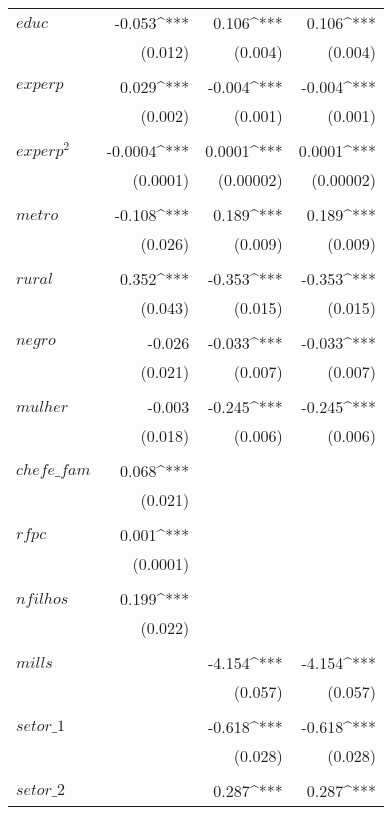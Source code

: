 \begin{apendicesenv}
\begin{footnotesize}
\begin{longtable}{@{\extracolsep{5pt}}lD{.}{.}{-3} D{.}{.}{-3} D{.}{.}{-3} }
	  $educ$ & -0.053^{***} & 0.106^{***} & 0.106^{***} \\ 
	  & (0.012) & (0.004) & (0.004) \\ 
	  & & & \\ 
	 $experp$ & 0.029^{***} & -0.004^{***} & -0.004^{***} \\ 
	  & (0.002) & (0.001) & (0.001) \\ 
	  & & & \\ 
	 $experp^{2}$ & -0.0004^{***} & 0.0001^{***} & 0.0001^{***} \\ 
	  & (0.0001) & (0.00002) & (0.00002) \\ 
	  & & & \\ 
	 $metro$ & -0.108^{***} & 0.189^{***} & 0.189^{***} \\ 
	  & (0.026) & (0.009) & (0.009) \\ 
	  & & & \\ 
	 $rural$ & 0.352^{***} & -0.353^{***} & -0.353^{***} \\ 
	  & (0.043) & (0.015) & (0.015) \\ 
	  & & & \\ 
	 $negro$ & -0.026 & -0.033^{***} & -0.033^{***} \\ 
	  & (0.021) & (0.007) & (0.007) \\ 
	  & & & \\ 
	 $mulher$ & -0.003 & -0.245^{***} & -0.245^{***} \\ 
	  & (0.018) & (0.006) & (0.006) \\ 
	  & & & \\ 
	 $chefe\_fam$ & 0.068^{***} &  &  \\ 
	  & (0.021) &  &  \\ 
	  & & & \\ 
	 $rfpc$ & 0.001^{***} &  &  \\ 
	  & (0.0001) &  &  \\ 
	  & & & \\ 
	 $nfilhos$ & 0.199^{***} &  &  \\ 
	  & (0.022) &  &  \\ 
	  & & & \\ 
	 $mills$ &  & -4.154^{***} & -4.154^{***} \\ 
	  &  & (0.057) & (0.057) \\ 
	  & & & \\ 
	 $setor\_1$ &  & -0.618^{***} & -0.618^{***} \\ 
	  &  & (0.028) & (0.028) \\ 
	  & & & \\ 
	 $setor\_2$ &  & 0.287^{***} & 0.287^{***} \\ 

\end{longtable}
\end{footnotesize}
\end{apendicesenv}
